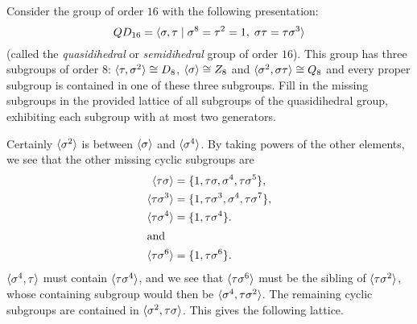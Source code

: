  Consider the group of order $16$ with the following
presentation:
\begin{equation*}
  QD_{16} = \langle{\sigma,\tau \mid \sigma^8 = \tau^2 = 1,\;
    \sigma\tau = \tau\sigma^3}\rangle
\end{equation*}
(called the {\em quasidihedral} or {\em semidihedral} group of order
$16$). This group has three subgroups of order $8$:
$\langle{\tau,\sigma^2}\rangle\cong D_8$, $\langle{\sigma}\rangle \cong Z_8$ and
$\langle{\sigma^2,\sigma\tau}\rangle\cong Q_8$ and every proper subgroup is
contained in one of these three subgroups. Fill in the missing
subgroups in the provided lattice of all subgroups of the
quasidihedral group, exhibiting each subgroup with at most two
generators.
\begin{solution}
  Certainly $\langle{\sigma^2}\rangle$ is between $\langle{\sigma}\rangle$ and
  $\langle{\sigma^4}\rangle$. By taking powers of the other elements, we see
  that the other missing cyclic subgroups are
  \begin{align*}
    \langle{\tau\sigma}\rangle &= \{1, \tau\sigma, \sigma^4, \tau\sigma^5\}, \\
    \langle{\tau\sigma^3}\rangle &= \{1, \tau\sigma^3, \sigma^4, \tau\sigma^7\}, \\
    \langle{\tau\sigma^4}\rangle &= \{1, \tau\sigma^4\}. \\\intertext{and}
    \langle{\tau\sigma^6}\rangle &= \{1, \tau\sigma^6\}.
  \end{align*}
  $\langle{\sigma^4,\tau}\rangle$ must contain $\langle{\tau\sigma^4}\rangle$, and we see
  that $\langle{\tau\sigma^6}\rangle$ must be the sibling of
  $\langle{\tau\sigma^2}\rangle$, whose containing subgroup would then be
  $\langle{\sigma^4, \tau\sigma^2}\rangle$. The remaining cyclic subgroups are
  contained in $\langle{\sigma^2, \tau\sigma}\rangle$. This gives the following
  lattice.
  \begin{center}
\end{center}
\end{solution}
